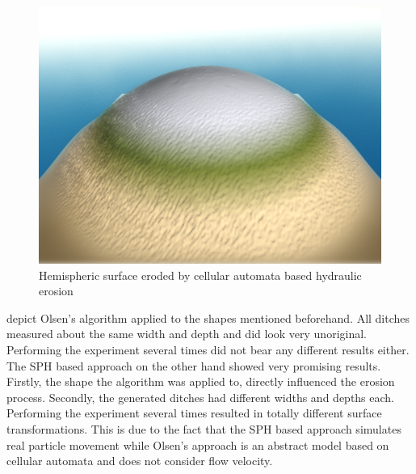 \documentclass[11pt,a4paper,twoside,openright]{report}
\begin{document}
\begin{figure}[!htb]
  \includegraphics[width=\linewidth]{hydro-10mins-46k-iterations-hemisphere.png}
  \caption{Hemispheric surface eroded by cellular automata based hydraulic erosion}\label{fig:hydro3}
\endminipage
\end{figure}
 depict Olsen's algorithm applied to the shapes mentioned beforehand. All ditches measured about the same width and depth and did look very unoriginal. Performing the experiment several times did not bear any different results either. The SPH based approach on the other hand showed very promising results. Firstly, the shape the algorithm was applied to, directly influenced the erosion process. Secondly, the generated ditches had different widths and depths each. Performing the experiment several times resulted in totally different surface transformations. This is due to the fact that the SPH based approach simulates real particle movement while Olsen's approach is an abstract model based on cellular automata and does not consider flow velocity.
\end{document}

